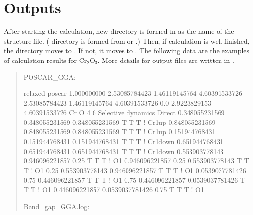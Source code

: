 \documentclass[letterpaper,10pt,english]{sphinxmanual}
\begin{document}
\section{Outputs}
\label{\detokenize{Overview/Overview:outputs}}
After starting the calculation, new directory is formed in  as the name of the structure
file. ( directory is formed from  or .)
Then, if calculation is well finished, the directory moves to . If not, it moves to .
The following data are the examples of calculation results for Cr$_{\text{2}}$O$_{\text{3}}$.
More details for output files are written in {\hyperref[\detokenize{Output/Output::doc}]{}}.
\begin{quote}

POSCAR\_GGA:

\begin{sphinxVerbatim}[commandchars=\\\{\}]
relaxed poscar
1.000000000
    2.53085784423    1.46119145764    4.60391533726
   \PYGZhy{}2.53085784423    1.46119145764    4.60391533726
    0.0             \PYGZhy{}2.9223829153     4.60391533726
    Cr    O
    4    6
Selective dynamics
Direct
    0.348055231569    0.348055231569    0.348055231569  T  T  T ! Cr1\PYGZus{}up
    0.848055231569    0.848055231569    0.848055231569  T  T  T ! Cr1\PYGZus{}up
    0.151944768431    0.151944768431    0.151944768431  T  T  T ! Cr1\PYGZus{}down
    0.651944768431    0.651944768431    0.651944768431  T  T  T ! Cr1\PYGZus{}down
    0.553903778143    0.946096221857    0.25            T  T  T ! O1
    0.946096221857    0.25              0.553903778143  T  T  T ! O1
    0.25              0.553903778143    0.946096221857  T  T  T ! O1
    0.0539037781426   0.75              0.446096221857  T  T  T ! O1
    0.75              0.446096221857    0.0539037781426 T  T  T ! O1
    0.446096221857    0.0539037781426   0.75            T  T  T ! O1
\end{sphinxVerbatim}

Band\_gap\_GGA.log:

\begin{sphinxVerbatim}[commandchars=\\\{\}]
         

               
               


\end{sphinxVerbatim}
\end{quote}
\end{document}
